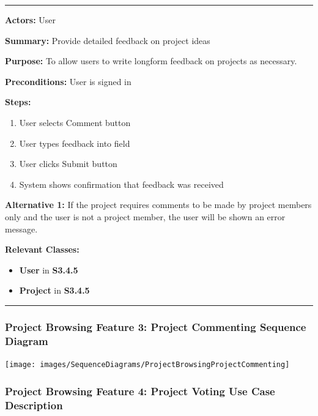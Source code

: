 \documentclass[twoside,letterpaper]{article}
\begin{document}
\vspace{2pt}
\hrule
\vspace{8pt}
\textbf{Actors:} User \newline

\noindent\textbf{Summary:} Provide detailed feedback on project ideas  \newline

\noindent\textbf{Purpose:} To allow users to write longform feedback on projects as necessary. \newline

\noindent\textbf{Preconditions:} User is signed in \newline

\noindent\textbf{Steps:} \begin{enumerate}
	\item User selects Comment button
	\item User types feedback into field
	\item User clicks Submit button
	\item System shows confirmation that feedback was received
\end{enumerate}
\noindent\textbf{Alternative 1:} If the project requires comments to be made by project members only and the user is not a project member, the user will be shown an error message. \newline


\noindent\textbf{Relevant Classes:}
\begin{itemize}
	\item \textbf{User} in \textbf{S3.4.5}
	\item \textbf{Project} in \textbf{S3.4.5}
\end{itemize}
\vspace{8pt}
\hrule
\newpage
\subsubsection[Project Browsing Feature 3: Project Commenting Sequence Diagram]{\rmfamily\bfseries\color{black}
	Project Browsing Feature 3: Project Commenting Sequence Diagram}
\hypertarget{RefHeading22059017292}{}

\bigskip

\texttt{[image: images/SequenceDiagrams/ProjectBrowsingProjectCommenting]}

\newpage
\subsubsection[Project Browsing Feature 4: Project Voting Use Case Description]{\rmfamily\bfseries\color{black}
Project Browsing Feature 4: Project Voting Use Case Description}
\hypertarget{RefHeading22059017292}{}
\end{document}
